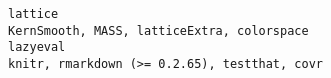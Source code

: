 \documentclass[
  letterpaper,
  DIV=11,
  numbers=noendperiod]{scrreprt}
\begin{document}
\begin{verbatim}
lattice                                                                                                                                                                                                                                                                                                                                                                                                                                                                                                                                                                                                                                                                                                                                                                                                                                                                                                                                                                                                                                                                                                                                                                                                                                                            KernSmooth, MASS, latticeExtra, colorspace
lazyeval                                                                                                                                                                                                                                                                                                                                                                                                                                                                                                                                                                                                                                                                                                                                                                                                                                                                                                                                                                                                                                                                                                                                                                                                                                                         knitr, rmarkdown (>= 0.2.65), testthat, covr

\end{verbatim}
\end{document}

